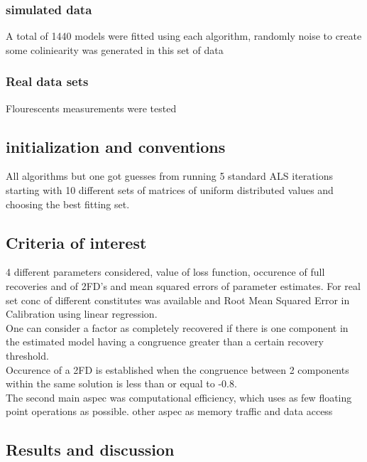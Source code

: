 \documentclass[10pt, draft]{article}
\begin{document}
  \subsubsection{simulated data}
  
  A total of 1440 models were fitted using each algorithm, randomly noise to create some coliniearity was generated in this set of data
  
  \subsubsection{Real data sets}
  Flourescents measurements were tested
  
  \subsection{initialization and conventions}
  
  All algorithms but one got guesses from running 5 standard ALS iterations starting with 10 different sets of matrices of uniform distributed values and choosing the best fitting set.  
  
  \subsection{Criteria of interest}
  4 different parameters considered, value of loss function, occurence of full recoveries and of 2FD's and mean squared errors of parameter estimates.  For real set conc of different constitutes was available and Root Mean Squared Error in Calibration using linear regression.  \\
  One can consider a factor as completely recovered if there is one component in the estimated model having a congruence greater than a certain recovery threshold.  \\
  Occurence of a 2FD is established when the congruence between 2 components within the same solution is less than or equal to -0.8.\\
  The second main aspec was computational efficiency, which uses as few floating point operations as possible.  other aspec as memory traffic and data access 
  
  
  \subsection{Results and discussion}
  
\end{document}
